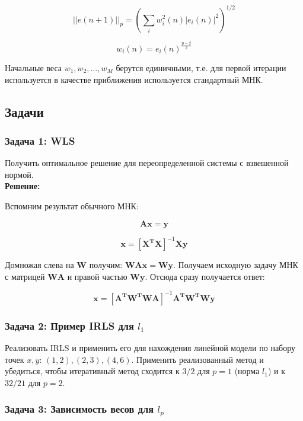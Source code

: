 \[
||e(n +1)||_p = \left( \sum_i w_i^2(n) |e_i(n)|^2 \right)^{1/2}
\]

\[
w_i(n) = e_i(n)^{\frac{p - 2}{2}}
\]

Начальные веса $w_1, w_2, \dots, w_M$ берутся единичными, т.е. для первой итерации используется в качестве приближения используется стандартный МНК.

\subsection{Задачи}

\subsubsection{Задача 1: WLS}

Получить оптимальное решение для переопределенной системы с взвешенной нормой. \\

\textbf{Решение:}

Вспомним результат обычного МНК:

\[
    \boldsymbol{A} \boldsymbol{x} = \boldsymbol{y}
\]

\[
    \boldsymbol{x} = \left[\boldsymbol{X^T X}\right]^{-1} \boldsymbol{X y}
\]

Домножая слева на $\boldsymbol{W}$ получим: $\boldsymbol{W} \boldsymbol{A} \boldsymbol{x} = \boldsymbol{W} \boldsymbol{y}$. Получаем исходную задачу МНК с матрицей $\boldsymbol{W} \boldsymbol{A}$ и правой частью $\boldsymbol{W} \boldsymbol{y}$. Отсюда сразу получается ответ:

\[
    \boldsymbol{x} = \left[ \boldsymbol{A^T W^T W A} \right]^{-1} \boldsymbol{A^T W^T W y}
\]

\subsubsection{Задача 2: Пример IRLS для $l_1$}

Реализовать IRLS и применить его для нахождения линейной модели по набору точек $x, y$: $(1, 2), (2, 3), (4, 6)$. Применить реализованный метод и убедиться, чтобы итеративный метод сходится к $3 / 2$ для $p = 1$ (норма $l_1$) и к $32 / 21$ для $p = 2$.

\subsubsection{Задача 3: Зависимость весов для $l_p$}

